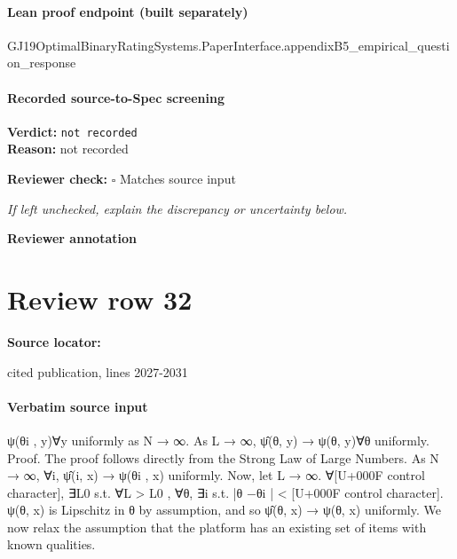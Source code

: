 \documentclass[10pt]{article}
\newcommand{\reviewerbox}{%
  \par\noindent\fbox{\parbox{0.96\linewidth}{\rule{0pt}{0.38in}}}\par
}
\newcommand{\reviewmatch}[1]{%
  \par\noindent\textbf{Reviewer check:} $\square$\; #1\par
  \noindent\emph{If left unchecked, explain the discrepancy or uncertainty below.}\par
}
\begin{document}
\paragraph{Lean proof endpoint (built separately)}\begin{ReviewVerbatim}
GJ19OptimalBinaryRatingSystems.PaperInterface.appendixB5_empirical_question_response
\end{ReviewVerbatim}

\paragraph{Recorded source-to-Spec screening}
\textbf{Verdict:} \texttt{not recorded}
\\
\textbf{Reason:} not recorded
\reviewmatch{Matches source input}
\noindent\textbf{Reviewer annotation}\par
\reviewerbox
\clearpage
\hypertarget{source-claim-276fd5feab006dec}{}
\section*{Review row 32}
\textbf{Source locator:} {\footnotesize\raggedright cited publication, lines 2027-\allowbreak{}2031\par}
\paragraph{Verbatim source input}
\begin{ReviewVerbatim}
ψ(θi , y)∀y uniformly as N → ∞. As L → ∞, ψ̂(θ, y) → ψ(θ, y)∀θ uniformly.
Proof. The proof follows directly from the Strong Law of Large Numbers. As N → ∞, ∀i, ψ̂(i, x) →
ψ(θi , x) uniformly. Now, let L → ∞. ∀[U+000F control character], ∃L0 s.t. ∀L > L0 , ∀θ, ∃i s.t. |θ −θi | < [U+000F control character]. ψ(θ, x) is Lipschitz
in θ by assumption, and so ψ̂(θ, x) → ψ(θ, x) uniformly.
We now relax the assumption that the platform has an existing set of items with known qualities.
\end{ReviewVerbatim}
\end{document}
